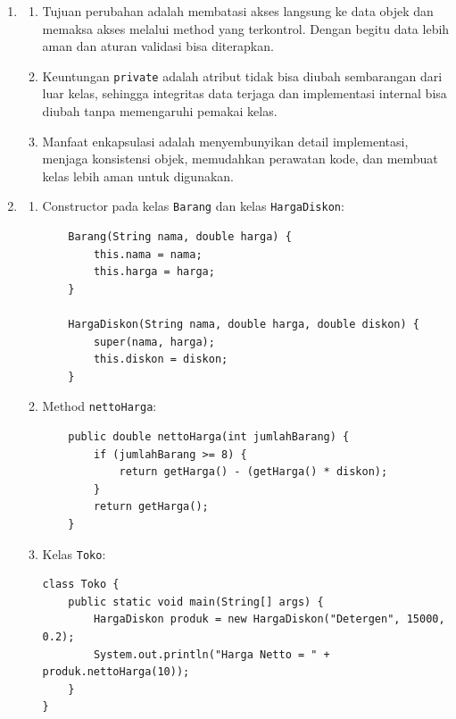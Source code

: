 \documentclass[11pt]{article}
\begin{document}
\begin{enumerate}
  \item
        \begin{enumerate}[label=\alph*)]
          \item Tujuan perubahan adalah membatasi akses langsung ke data objek dan memaksa akses melalui method yang terkontrol. Dengan begitu data lebih aman dan aturan validasi bisa diterapkan.

          \item Keuntungan \texttt{private} adalah atribut tidak bisa diubah sembarangan dari luar kelas, sehingga integritas data terjaga dan implementasi internal bisa diubah tanpa memengaruhi pemakai kelas.

          \item Manfaat enkapsulasi adalah menyembunyikan detail implementasi, menjaga konsistensi objek, memudahkan perawatan kode, dan membuat kelas lebih aman untuk digunakan.
        \end{enumerate}

  \item
        \begin{enumerate}[label=\alph*)]
          \item Constructor pada kelas \texttt{Barang} dan kelas \texttt{HargaDiskon}:
                \begin{verbatim}
    Barang(String nama, double harga) {
        this.nama = nama;
        this.harga = harga;
    }

    HargaDiskon(String nama, double harga, double diskon) {
        super(nama, harga);
        this.diskon = diskon;
    }
                \end{verbatim}

          \item Method \texttt{nettoHarga}:
                \begin{verbatim}
    public double nettoHarga(int jumlahBarang) {
        if (jumlahBarang >= 8) {
            return getHarga() - (getHarga() * diskon);
        }
        return getHarga();
    }
                \end{verbatim}

          \item Kelas \texttt{Toko}:
                \begin{verbatim}
class Toko {
    public static void main(String[] args) {
        HargaDiskon produk = new HargaDiskon("Detergen", 15000, 0.2);
        System.out.println("Harga Netto = " + produk.nettoHarga(10));
    }
}
                \end{verbatim}
        \end{enumerate}


\end{enumerate}
\end{document}
